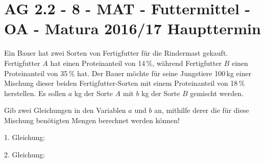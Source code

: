 \section{AG 2.2 - 8 - MAT - Futtermittel - OA - Matura 2016/17 Haupttermin}

\begin{beispiel}[AG 2.2]{1} %
Ein Bauer hat zwei Sorten von Fertigfutter für die Rindermast gekauft. Fertigfutter $A$ hat einen Proteinanteil von 14\,\%, während Fertigfutter $B$ einen Proteinanteil von 35\,\% hat.
Der Bauer möchte für seine Jungstiere 100\,kg einer Mischung dieser beiden Fertigfutter-Sorten
mit einem Proteinanteil von 18\,\% herstellen. Es sollen $a$ kg der Sorte $A$ mit $b$ kg der Sorte $B$ gemischt werden.\leer

Gib zwei Gleichungen in den Variablen $a$ und $b$ an, mithilfe derer die für diese Mischung benötigten Mengen berechnet werden können!\leer


1. Gleichung:  \leer

2. Gleichung: 
\end{beispiel}